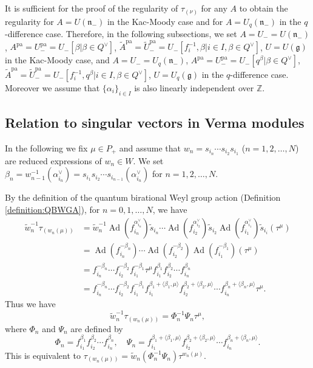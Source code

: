 \documentclass[12pt,twoside]{article}
\newcommand\bra{\langle}
\newcommand\ket{\rangle}
\newcommand\Ad{\mathop{\mathrm{Ad}}\nolimits}
\newcommand\av{\alpha^\vee}
\newcommand\Qv{Q^\vee}
\newcommand\tw{{\widetilde w}}
\newcommand\ts{{\tilde s}}
\newcommand\tU{{\widetilde U}}
\newcommand\tA{{\widetilde A}}
\newcommand\g{{\mathfrak g}}
\newcommand\n{{\mathfrak n}}
\newcommand\pa{{\mathrm{pa}}}
\newcommand\Z{{\mathbb Z}} %
\theoremstyle{plain} %
\theoremstyle{definition} %
\theoremstyle{definition} %
\numberwithin{theorem}{section}
\numberwithin{equation}{section}
\numberwithin{figure}{section}
\numberwithin{table}{section}
\newcommand\definitionref[1]{Definition \ref{#1}}
\begin{document}
It is sufficient for the proof of the regularity of $\tau_{(\nu)}$ for any $A$
to obtain the regularity for $A=U(\n_-)$ in the Kac-Moody case
and for $A=U_q(\n_-)$ in the $q$-difference case.
Therefore, in the following subsections, we set
$A=U_-=U(\n_-)$, 
$A^\pa=U_-^\pa=U_-[\beta|\beta\in\Qv]$, 
$\tA^\pa=\tU_-^\pa=U_-[f_i^{-1},\beta|i\in I,\beta\in\Qv]$, 
$U=U(\g)$
in the Kac-Moody case, 
and
$A=U_-=U_q(\n_-)$, 
$A^\pa=U_-^\pa=U_-[q^\beta|\beta\in\Qv]$, 
$\tA^\pa=\tU_-^\pa=U_-[f_i^{-1},q^\beta|i\in I,\beta\in\Qv]$, 
$U=U_q(\g)$
in the $q$-difference case.
Moreover we assume that 
$\{\alpha_i\}_{i\in I}$ is also linearly independent over $\Z$.


\subsection{Relation to singular vectors in Verma modules}
\label{sec:sing}

In the following we fix $\mu\in P_+$ and assume that 
$w_n = s_{i_n}\cdots s_{i_2}s_{i_1}$ ($n=1,2,\ldots,N$) 
are reduced expressions of $w_n\in W$.
We set 
$\beta_n = w_{n-1}^{-1}(\av_{i_n})=s_{i_1}s_{i_2}\cdots s_{i_{n-1}}(\av_{i_n})$
for $n=1,2,\ldots,N$.

By the definition of the quantum birational Weyl group action 
(\definitionref{definition:QBWGA}), 
for $n=0,1,\ldots,N$, we have
\begin{align*}
  \tw_n^{-1}\tau_{(w_n(\mu))} 
  &
  =\tw_n^{-1}
    \Ad(f_{i_n}^{\av_{i_n}})\ts_{i_n}\cdots
    \Ad(f_{i_2}^{\av_{i_2}})\ts_{i_2}
    \Ad(f_{i_1}^{\av_{i_1}})\ts_{i_i}(\tau^\mu)
  \\ &
  = 
    \Ad(f_{i_n}^{-\beta_n})\cdots
    \Ad(f_{i_2}^{-\beta_2})
    \Ad(f_{i_1}^{-\beta_1})(\tau^\mu)
  \\ &
  = 
    f_{i_n}^{-\beta_n}\cdots f_{i_2}^{-\beta_2}f_{i_1}^{-\beta_1}
    \tau^\mu
    f_{i_1}^{\beta_1} f_{i_2}^{\beta_2} \cdots  f_{i_n}^{\beta_n}
  \\ &
  = 
    f_{i_n}^{-\beta_n}\cdots 
    f_{i_2}^{-\beta_2}
    f_{i_1}^{-\beta_1}
    f_{i_1}^{\beta_1+\bra\beta_1,\mu\ket}
    f_{i_2}^{\beta_2+\bra\beta_2,\mu\ket}\cdots 
    f_{i_n}^{\beta_n+\bra\beta_n,\mu\ket}
    \tau^\mu.
\end{align*}
Thus we have
\begin{equation*}
 \tw_n^{-1}\tau_{(w_n(\mu))} = \Phi_n^{-1}\Psi_n\tau^\mu, 
\end{equation*}
where $\Phi_n$ and $\Psi_n$ are defined by
\begin{equation*}
 \Phi_n = 
 f_{i_1}^{\beta_1}
 f_{i_2}^{\beta_2}\cdots
 f_{i_n}^{\beta_n},
 \quad
 \Psi_n = 
 f_{i_1}^{\beta_1+\bra\beta_1,\mu\ket}
 f_{i_2}^{\beta_2+\bra\beta_2,\mu\ket}\cdots
 f_{i_n}^{\beta_n+\bra\beta_n,\mu\ket}.
\end{equation*}
This is equivalent to 
$\tau_{(w_n(\mu))} = \tw_n(\Phi_n^{-1}\Psi_n)\tau^{w_n(\mu)}$.
\end{document}
